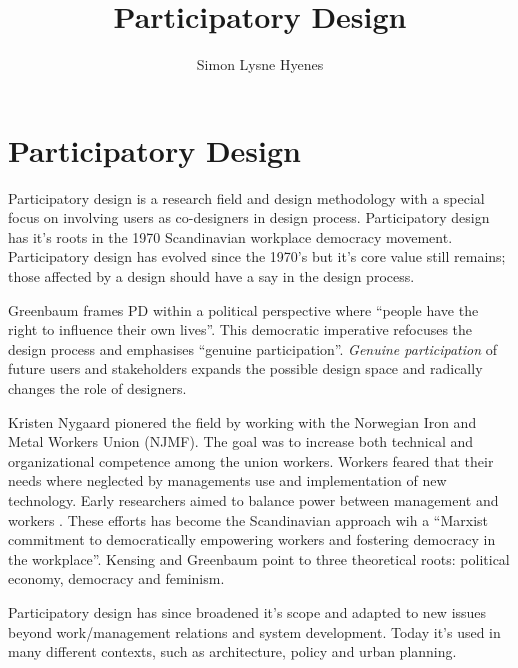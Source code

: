 \documentclass[11pt,UKenglish, a4paper]{article}
\author{Simon Lysne Hyenes}
\title{Participatory Design}
\begin{document}
\section{Participatory Design}

Participatory design is a research field and design methodology with a special focus on involving users as co-designers in design process. Participatory design has it's roots in the 1970 Scandinavian workplace democracy movement. Participatory design has evolved since the 1970's but it's core value still remains; those affected by a design should have a say in the design process\cite{Simonsen2012Routledge}.

Greenbaum frames PD within a political perspective where ``people have the right to influence their own lives''\cite[p.~39]{Hagen2010Social}. This democratic imperative refocuses the design process and emphasises ``genuine participation''\cite[p.~5]{Robertson2006Ethical}. 
\textit{Genuine participation} of future users and stakeholders expands the possible design space and radically changes the role of designers. 

Kristen Nygaard pionered the field by working with the Norwegian Iron and Metal Workers Union (NJMF). The goal was to increase both technical and organizational competence among the union workers. Workers feared that their needs where neglected by managements use and implementation of new technology. Early researchers aimed to balance power between management and workers \cite[p~.170]{Kensing1998Participatory}. These efforts has become the Scandinavian approach wih a ``Marxist commitment to democratically empowering workers and fostering democracy in the workplace''\cite[p.~164]{Spinuzzi2005Methodology}. Kensing and Greenbaum point to three theoretical roots: political economy, democracy and feminism\cite[p.~31]{Kensing2013Heritage}. 


Participatory design has since broadened it's scope and adapted to new issues beyond work/management relations and system development. Today it's used in many different contexts, such as architecture, policy and urban planning\cite[p.~2]{Velden2014RePoliticising}. 
\end{document}
